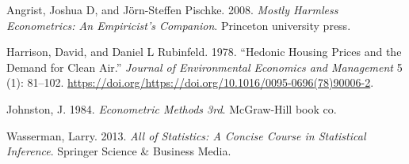 \documentclass[
  12pt,
]{article}
\newlength{\cslhangindent}
\newenvironment{cslreferences}%
  {\setlength{\parindent}{0pt}%
  \everypar{\setlength{\hangindent}{\cslhangindent}}\ignorespaces}%
  {\par}
\begin{document}
\hypertarget{refs}{}
\begin{cslreferences}
\leavevmode\hypertarget{ref-angrist2008mostly}{}%
Angrist, Joshua D, and Jörn-Steffen Pischke. 2008. \emph{Mostly Harmless Econometrics: An Empiricist's Companion}. Princeton university press.

\leavevmode\hypertarget{ref-Boston}{}%
Harrison, David, and Daniel L Rubinfeld. 1978. ``Hedonic Housing Prices and the Demand for Clean Air.'' \emph{Journal of Environmental Economics and Management} 5 (1): 81--102. \url{https://doi.org/https://doi.org/10.1016/0095-0696(78)90006-2}.

\leavevmode\hypertarget{ref-johnston1984econometric}{}%
Johnston, J. 1984. \emph{Econometric Methods 3rd}. McGraw-Hill book co.

\leavevmode\hypertarget{ref-wasserman2013all}{}%
Wasserman, Larry. 2013. \emph{All of Statistics: A Concise Course in Statistical Inference}. Springer Science \& Business Media.
\end{cslreferences}
\end{document}
